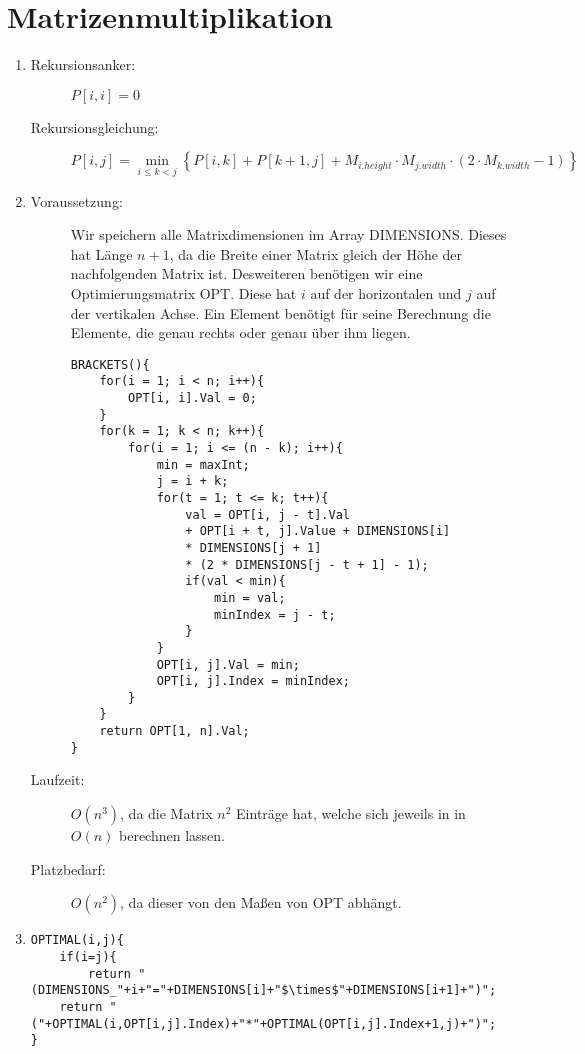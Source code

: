 \documentclass[a4paper,10pt]{scrartcl}
\begin{document}
\section{Matrizenmultiplikation}
\begin{enumerate}
\item \begin{description}
	\item[Rekursionsanker:] $P\left[i, i\right] = 0$
	\item[Rekursionsgleichung:] $P\left[i, j\right] = \min\limits_{i \leq k < j}\left\{P\left[i, k\right] + P\left[k + 1, j\right] + M_{i.height} \cdot M_{j.width} \cdot \left( 2 \cdot M_{k.width} - 1 \right) \right\}$
\end{description} 
\item \begin{description}
	\item[Voraussetzung:] Wir speichern alle Matrixdimensionen im
	Array DIMENSIONS. Dieses hat Länge $n+1$, da die Breite einer
	Matrix gleich der Höhe der nachfolgenden Matrix ist.
	Desweiteren benötigen wir eine Optimierungsmatrix OPT. Diese hat
	$i$ auf der horizontalen und $j$ auf der vertikalen Achse. Ein
	Element benötigt für seine Berechnung die Elemente, die genau rechts oder genau über ihm liegen.
\begin{lstlisting}[mathescape=true,numbers=none]
BRACKETS(){
	for(i = 1; i < n; i++){
		OPT[i, i].Val = 0;
	}
	for(k = 1; k < n; k++){
		for(i = 1; i <= (n - k); i++){
			min = maxInt;
			j = i + k;
			for(t = 1; t <= k; t++){
				val = OPT[i, j - t].Val 
				+ OPT[i + t, j].Value + DIMENSIONS[i] 
				* DIMENSIONS[j + 1] 
				* (2 * DIMENSIONS[j - t + 1] - 1);
				if(val < min){
					min = val;
					minIndex = j - t;
				}
			}
			OPT[i, j].Val = min;
			OPT[i, j].Index = minIndex;
		}
	}
	return OPT[1, n].Val;
}
\end{lstlisting}
	\item[Laufzeit:] $O(n^3)$, da die Matrix $n^2$ Einträge hat,
	welche sich jeweils in in $O(n)$ berechnen lassen.
	\item[Platzbedarf:] $O(n^2)$, da dieser von den Maßen von OPT
	abhängt.
	\end{description}
\item 
\begin{lstlisting}[mathescape=true,numbers=none]
OPTIMAL(i,j){
	if(i=j){
		return "(DIMENSIONS_"+i+"="+DIMENSIONS[i]+"$\times$"+DIMENSIONS[i+1]+")";
	return "("+OPTIMAL(i,OPT[i,j].Index)+"*"+OPTIMAL(OPT[i,j].Index+1,j)+")";
}
\end{lstlisting}
\end{enumerate}
\end{document}
